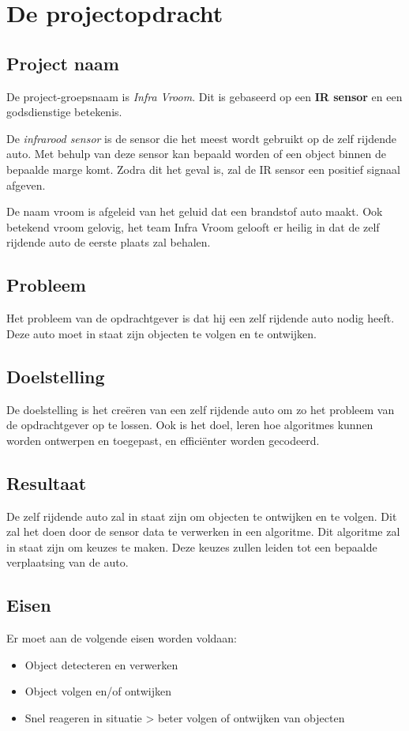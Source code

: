 \section{De projectopdracht}
\subsection{Project naam}
De project-groepsnaam is \textit{Infra Vroom}. Dit is gebaseerd op een \textbf{IR sensor} en een godsdienstige betekenis.

De \textit{infrarood sensor} is de sensor die het meest wordt gebruikt op de zelf rijdende auto. Met behulp van deze sensor kan bepaald worden of een object binnen de bepaalde marge komt. Zodra dit het geval is, zal de IR sensor een positief signaal afgeven.

De naam vroom is afgeleid van het geluid dat een brandstof auto maakt. Ook betekend vroom gelovig, het team Infra Vroom gelooft er heilig in dat de zelf rijdende auto de eerste plaats zal behalen.

\subsection{Probleem}
Het probleem van de opdrachtgever is dat hij een zelf rijdende auto nodig heeft. Deze auto moet in staat zijn objecten te volgen en te ontwijken.

\subsection{Doelstelling}
De doelstelling is het creëren van een zelf rijdende auto om zo het probleem van de opdrachtgever op te lossen. Ook is het doel, leren hoe algoritmes kunnen worden ontwerpen en toegepast, en efficiënter worden gecodeerd.

\subsection{Resultaat}
De zelf rijdende auto zal in staat zijn om objecten te ontwijken en te volgen. Dit zal het doen door de sensor data te verwerken in een algoritme. Dit algoritme zal in staat zijn om keuzes te maken. Deze keuzes zullen leiden tot een bepaalde verplaatsing van de auto.

\subsection{Eisen}
Er moet aan de volgende eisen worden voldaan:
\begin{itemize}
   \item Object detecteren en verwerken
   \item Object volgen en/of ontwijken
   \item Snel reageren in situatie > beter volgen of ontwijken van objecten
 \end{itemize}

